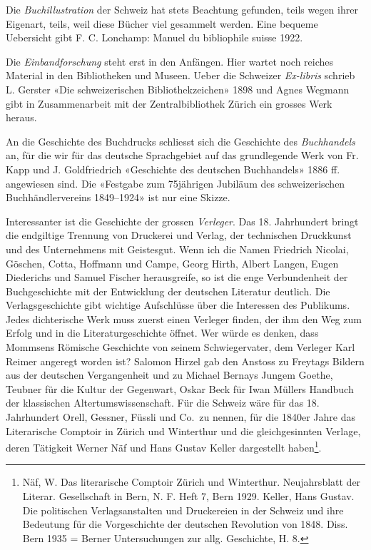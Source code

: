 \documentclass[a4paper,
fontsize=11pt,
oneside,
numbers=noperiodatend,
parskip=half-,
bibliography=totoc,
final
]{scrartcl}
\begin{document}
Die \emph{Buchillustration} der Schweiz hat stets Beachtung gefunden,
teils wegen ihrer Eigenart, teils, weil diese Bücher viel gesammelt
werden. Eine bequeme Uebersicht gibt F. C. Lonchamp: Manuel du
bibliophile suisse 1922.

Die \emph{Einbandforschung} steht erst in den Anfängen. Hier wartet noch
reiches Material in den Bibliotheken und Museen. Ueber die Schweizer
\emph{Ex-libris} schrieb L. Gerster «Die schweizerischen
Bibliothekzeichen» 1898 und Agnes Wegmann gibt in Zusammenarbeit mit der
Zentralbibliothek Zürich ein grosses Werk heraus.

An die Geschichte des Buchdrucks schliesst sich die Geschichte des
\emph{Buchhandels} an, für die wir für das deutsche Sprachgebiet auf das
grundlegende Werk von Fr. Kapp und J. Goldfriedrich «Geschichte des
deutschen Buchhandels» 1886 ff. angewiesen sind. Die «Festgabe zum
75jährigen Jubiläum des schweizerischen Buchhändlervereins 1849--1924»
ist nur eine Skizze.

Interessanter ist die Geschichte der grossen \emph{Verleger}. Das 18.
Jahrhundert bringt die endgiltige Trennung von Druckerei und Verlag, der
technischen Druckkunst und des Unternehmens mit Geistesgut. Wenn ich die
Namen Friedrich Nicolai, Göschen, Cotta, Hoffmann und Campe, Georg
Hirth, Albert Langen, Eugen Diederichs und Samuel Fischer herausgreife,
so ist die enge Verbundenheit der Buchgeschichte mit der Entwicklung der
deutschen Literatur deutlich. Die Verlagsgeschichte gibt wichtige
Aufschlüsse über die Interessen des Publikums. Jedes dichterische Werk
muss zuerst einen Verleger finden, der ihm den Weg zum Erfolg und in die
Literaturgeschichte öffnet. Wer würde es denken, dass Mommsens Römische
Geschichte von seinem Schwiegervater, dem Verleger Karl Reimer angeregt
worden ist? Salomon Hirzel gab den Anstoss zu Freytags Bildern aus der
deutschen Vergangenheit und zu Michael Bernays Jungem Goethe, Teubner
für die Kultur der Gegenwart, Oskar Beck für Iwan Müllers Handbuch der
klassischen Altertumswissenschaft. Für die Schweiz wäre für das 18.
Jahrhundert Orell, Gessner, Füssli und Co.~zu nennen, für die 1840er
Jahre das Literarische Comptoir in Zürich und Winterthur und die
gleichgesinnten Verlage, deren Tätigkeit Werner Näf und Hans Gustav
Keller dargestellt haben\footnote{Näf, W. Das literarische Comptoir
  Zürich und Winterthur. Neujahrsblatt der Literar. Gesellschaft in
  Bern, N. F. Heft 7, Bern 1929. Keller, Hans Gustav. Die politischen
  Verlagsanstalten und Druckereien in der Schweiz und ihre Bedeutung für
  die Vorgeschichte der deutschen Revolution von 1848. Diss. Bern 1935 =
  Berner Untersuchungen zur allg. Geschichte, H. 8.}.
\end{document}
